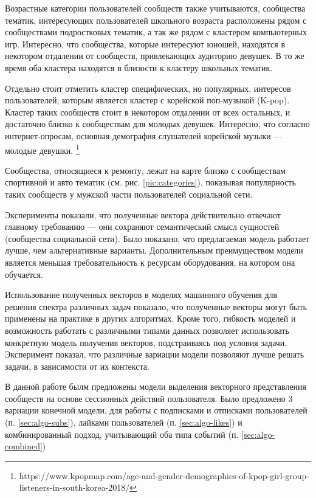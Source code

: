 \documentclass[times,specification,annotation]{itmo-student-thesis}
\begin{document}
Возрастные категории пользователей сообществ также учитываются, сообщества тематик, интересующих пользователей школьного возраста расположены рядом с сообществами подростковых тематик, а так же рядом с кластером компьютерных игр. Интересно, что сообщества, которые интересуют юношей, находятся в некотором отдалении от сообществ, привлекающих аудиторию девушек. В то же время оба кластера находятся в близости к кластеру школьных тематик.

Отдельно стоит отметить кластер специфических, но популярных, интересов пользователей, которым является кластер с корейской поп-музыкой (K-pop). Кластер таких сообществ стоит в некотором отдалении от всех остальных, и достаточно близко к сообществам для молодых девушек. Интересно, что согласно интернет-опросам, основная демография слушателей корейской музыки --- молодые девушки. \footnote{https://www.kpopmap.com/age-and-gender-demographics-of-kpop-girl-group-listeners-in-south-korea-2018/}

Сообщества, относящиеся к ремонту, лежат на карте близко с сообществам спортивной и авто тематик (см. рис. \ref{pic:categories}), показывая популярность таких сообществ у мужской части пользователей социальной сети.    

\chapterconclusion

Эксперименты показали, что полученные вектора действительно отвечают главному требованию --- они сохраняют семантический смысл сущностей (сообщества социальной сети). Было показано, что предлагаемая модель работает лучше, чем альтернативные варианты. Дополнительным преимуществом модели является меньшая требовательность к ресурсам оборудования, на котором она обучается. 

Использование полученных векторов в моделях машинного обучения для решения спектра различных задач показало, что полученные векторы могут быть применены на практике в других алгоритмах. Кроме того, гибкость моделей и возможность работать с различными типами данных позволяет использовать конкретную модель получения векторов, подстраиваясь под условия задачи. Эксперимент показал, что различные вариации модели позволяют лучше решать задачи, в зависимости от их контекста. 


\startconclusionpage

В данной работе былм предложены модели выделения векторного представления сообществ на основе сессионных действий пользователя. Было предложено 3 вариации конечной модели, для работы с подписками и отписками пользователей (п. \ref{sec:algo-subs}), лайками пользователей (п. \ref{sec:algo-likes}) и комбинированный подход, учитывающий оба типа событий (п. \ref{sec:algo-combined})
\end{document}
